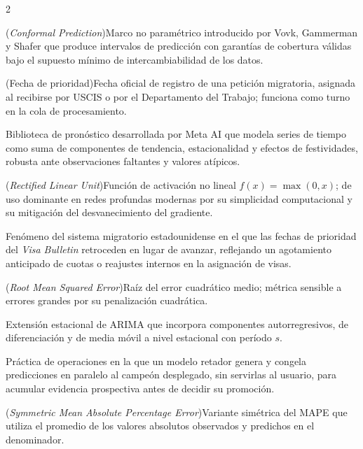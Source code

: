 \documentclass[12pt,letterpaper]{report}
\begin{document}
\begin{multicols}{2}
\begin{description}[leftmargin=0pt, labelindent=0pt, itemindent=0pt,
                    labelsep=0.4em, font=\bfseries\scriptsize,
                    itemsep=2pt, parsep=0pt, topsep=0pt]
    \item[Predicción conforme] (\textit{Conformal Prediction})\hspace{0.3em}Marco no paramétrico introducido por Vovk, Gammerman y Shafer que produce intervalos de predicción con garantías de cobertura válidas bajo el supuesto mínimo de intercambiabilidad de los datos.

    \item[Priority Date] (Fecha de prioridad)\hspace{0.3em}Fecha oficial de registro de una petición migratoria, asignada al recibirse por USCIS o por el Departamento del Trabajo; funciona como turno en la cola de procesamiento.

    \item[Prophet] Biblioteca de pronóstico desarrollada por Meta AI que modela series de tiempo como suma de componentes de tendencia, estacionalidad y efectos de festividades, robusta ante observaciones faltantes y valores atípicos.

    \item[ReLU] (\textit{Rectified Linear Unit})\hspace{0.3em}Función de activación no lineal $f(x) = \max(0, x)$; de uso dominante en redes profundas modernas por su simplicidad computacional y su mitigación del desvanecimiento del gradiente.

    \item[Retrogresión] Fenómeno del sistema migratorio estadounidense en el que las fechas de prioridad del \textit{Visa Bulletin} retroceden en lugar de avanzar, reflejando un agotamiento anticipado de cuotas o reajustes internos en la asignación de visas.

    \item[RMSE] (\textit{Root Mean Squared Error})\hspace{0.3em}Raíz del error cuadrático medio; métrica sensible a errores grandes por su penalización cuadrática.

    \item[SARIMA] Extensión estacional de ARIMA que incorpora componentes autorregresivos, de diferenciación y de media móvil a nivel estacional con período $s$.
    \item[Shadow deployment (despliegue en sombra)] Práctica de operaciones en la que un modelo retador genera y congela predicciones en paralelo al campeón desplegado, sin servirlas al usuario, para acumular evidencia prospectiva antes de decidir su promoción.

    \item[sMAPE] (\textit{Symmetric Mean Absolute Percentage Error})\hspace{0.3em}Variante simétrica del MAPE que utiliza el promedio de los valores absolutos observados y predichos en el denominador.


\end{description}
\end{multicols}
\end{document}
